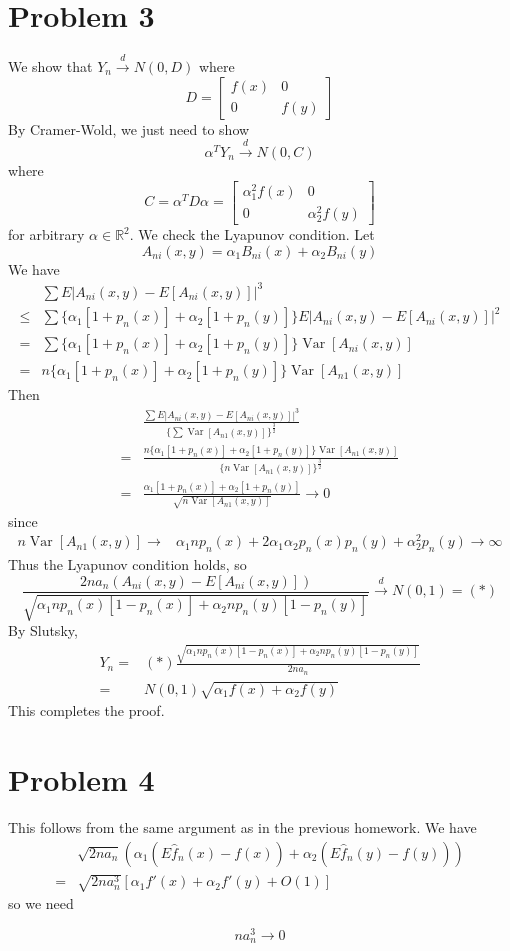 \documentclass{article}
\newcommand{\hf}{\hat{f}}
\newcommand{\dto}{\overset{d}{\to}}
\newcommand{\Var}{\operatorname{Var}}
\newcommand{\R}{\mathbb{R}}
\begin{document}
\section{Problem 3}

We show that $Y_n \dto N(0, D)$ where
\[
  D =
  \begin{bmatrix}
    f(x) & 0 \\
    0 & f(y)
  \end{bmatrix}
\]
By Cramer-Wold, we just need to show
\[
  \alpha^T Y_n \dto N(0, C)
\]
where
\[
  C = \alpha^T D \alpha =
  \begin{bmatrix}
    \alpha_1^2 f(x) & 0 \\
    0 & \alpha_2^2 f(y)
  \end{bmatrix}
\]
for arbitrary $\alpha \in \R^2$.  We check the Lyapunov condition.
Let
\[
  A_{ni}(x,y) = \alpha_1 B_{ni}(x) + \alpha_2 B_{ni}(y)
\]
We have
\begin{align*}
  & \sum E|A_{ni}(x,y) - E[A_{ni}(x,y)]|^3 \\
  \leq & \sum \{\alpha_1[1+p_n(x)] + \alpha_2 [1+p_n(y)] \} E|A_{ni}(x,y) - E[A_{ni}(x,y)]|^2 \\
  = & \sum \{\alpha_1[1+p_n(x)] + \alpha_2 [1+p_n(y)] \} \Var[A_{ni}(x,y)] \\
  = & n \{\alpha_1[1+p_n(x)] + \alpha_2 [1+p_n(y)] \} \Var[A_{n1}(x,y)]
\end{align*}
Then
\begin{align*}
  & \frac{\sum E|A_{ni}(x,y) - E[A_{ni}(x,y)]|^3}{\{\sum \Var[A_{n1}(x,y)]\}^\frac{3}{2}}  \\
  = & \frac{n \{\alpha_1[1+p_n(x)] + \alpha_2 [1+p_n(y)] \} \Var[A_{n1}(x,y)]}{\{n\Var[A_{n1}(x,y)]\}^\frac{3}{2}} \\
  = & \frac{\alpha_1[1+p_n(x)] + \alpha_2 [1+p_n(y)]}{\sqrt{n\Var[A_{n1}(x,y)]}} \to 0
\end{align*}
since
\begin{align*}
  n\Var[A_{n1}(x,y)] \to & \alpha_1 np_n(x) + 2\alpha_1\alpha_2p_n(x)p_n(y) + \alpha_2^2 p_n(y) \to \infty
\end{align*}
Thus the Lyapunov condition holds, so
\[
  \frac{2na_n(A_{ni}(x,y) - E[A_{ni}(x,y)])}{\sqrt{\alpha_1 np_n(x)[1-p_n(x)] + \alpha_2 np_n(y)[1-p_n(y)]}} \dto N(0, 1) = (*)
\]
By Slutsky,
\begin{align*}
  Y_n = & (*) \frac{\sqrt{\alpha_1 np_n(x)[1-p_n(x)] + \alpha_2 np_n(y)[1-p_n(y)]}}{2na_n} \\
  = & N(0, 1)\sqrt{\alpha_1 f(x) + \alpha_2 f(y)}
\end{align*}
This completes the proof.

\section{Problem 4}

This follows from the same argument as in the previous homework.
We have
\begin{align*}
  & \sqrt{2na_n}(\alpha_1 (E\hf_n(x) - f(x)) + \alpha_2 (E\hf_n(y) - f(y))) \\ = & \sqrt{2na_n^3}[\alpha_1 f'(x) + \alpha_2 f'(y) + O(1)]
\end{align*}
so we need

\[
  na_n^3 \to 0
\]
\end{document}
